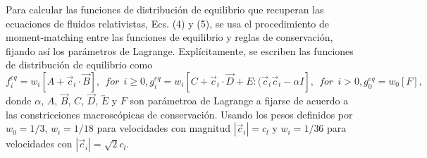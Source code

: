 \documentclass{article}
\begin{document}
Para calcular las funciones de distribución de equilibrio que recuperan las ecuaciones de fluidos relativistas, Ecs. (4) y (5), se usa el procedimiento de moment-matching entre las funciones de equilibrio y reglas de conservación, fijando así los parámetros de Lagrange. Explícitamente, se escriben las funciones de distribución de equilibrio como
\begin{subequations}
\begin{equation}
    f_i^{eq} = w_i [A + \vec{c}_i \cdot \vec{B}], \ \ for \ \ i\geq 0, 
\end{equation}
\begin{equation}
    g_i^{eq} = w_i [C + \vec{c}_i \cdot \vec{D} + E:(\vec{c}_i \vec{c}_i -\alpha I], \ \ for \ \ i > 0, 
\end{equation}
\begin{equation}
g_0^{eq} = w_0 [F], 
\end{equation}
 \end{subequations}
 donde $\alpha$, $A$, $\vec{B}$, $C$, $\vec{D}$, $\overleftrightarrow{E}$ y $F$ son parámetroa de Lagrange a fijarse de acuerdo a las constricciones macroscópicas de conservación. Usando los pesos definidos por $w_0=1/3$, $w_i=1/18$ para velocidades con magnitud $|\vec{c}_i|=c_l$ y $w_i = 1/36$ para velocidades con $|\vec{c}_i|=\sqrt{2}c_l$.\\
 
\end{document}
